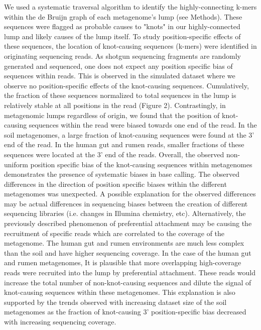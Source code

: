 \documentclass[11pt]{article} %
\begin{document}
We used a systematic traversal algorithm to identify the highly-connecting k-mers within the de Bruijn graph of each metagenome's lump (see Methods).  These sequences were flagged as probable causes to "knots" in our highly-connected lump and likely causes of the lump itself.  To study position-specific effects of these sequences, the location of knot-causing sequences (k-mers) were identified in originating sequencing reads.   
	As shotgun sequencing fragments are randomly generated and sequenced, one does not expect any position specific bias of sequences within reads.  This is observed in the simulated dataset where we observe no position-specific effects of the knot-causing sequences.  Cumulatively, the fraction of these sequences normalized to total sequences in the lump is relatively stable at all positions in the read (Figure 2).  Contrastingly, in metagenomic lumps regardless of origin, we found that the position of knot-causing sequences within the read were biased towards one end of the read.  In the soil metagenomes, a large fraction of knot-causing sequences were found at the 3' end of the read.  In the human gut and rumen reads, smaller fractions of these sequences were located at the 3' end of the reads.  Overall, the observed non-uniform position specific bias of the knot-causing sequences within metagenomes demonstrates the presence of systematic biases in base calling. 
	The observed differences in the direction of position specific biases within the different metagenomes was unexpected. A possible explanation for the observed differences may be actual differences in sequencing biases between the creation of different sequencing libraries (i.e. changes in Illumina chemistry, etc).  Alternatively, the previously described phenomenon of preferential attachment may be causing the recruitment of specific reads which are correlated to the coverage of the metagenome.  The human gut and rumen environments are much less complex than the soil and have higher sequencing coverage.  In the case of the human gut and rumen metagenomes, It is plausible that more overlapping high-coverage reads were recruited into the lump by preferential attachment.  These reads would increase the total number of non-knot-causing sequences and dilute the signal of knot-causing sequences within these metagenomes.  This explanation is also supported by the trends observed with increasing dataset size of the soil metagenomes as the fraction of knot-causing 3' position-specific bias decreased with increasing sequencing coverage.
\end{document}
